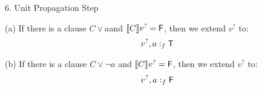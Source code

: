 \documentclass[xetex,aspectratio=169,14pt,hyperref={pdfpagelabels=true,pdflang={en-GB}}]{beamer}
\begin{document}
\begin{frame}
  {6. Unit Propagation Step}

  (a) If there is a clause $C \lor a$and $\llbracket C \rrbracket v^? = \mathsf{F}$, then we
  extend $v^?$ to:
  \begin{displaymath}
    v^?, a :_f \mathsf{T}
  \end{displaymath}

  \medskip

  (b) If there is a clause $C \lor \lnot a$ and $\llbracket C \rrbracket v^? = \mathsf{F}$,
  then we extend $v^?$ to:
  \begin{displaymath}
    v^?, a :_f \mathsf{F}
  \end{displaymath}


\end{frame}
\end{document}
